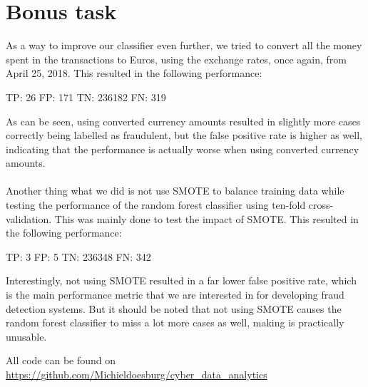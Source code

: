 \documentclass[]{article}
\begin{document}
\section{Bonus task}
As a way to improve our classifier even further, we tried to convert all the money spent in the transactions to Euros, using the exchange rates, once again, from April 25, 2018. This resulted in the following performance:
\begin{flushleft}
	TP: 26 \newline
	FP: 171  \newline
	TN: 236182 \newline
	FN: 319 \newline
\end{flushleft}
As can be seen, using converted currency amounts resulted in slightly more cases correctly being labelled as fraudulent, but the false positive rate is higher as well, indicating that the performance is actually worse when using converted currency amounts.\\
\\
Another thing what we did is not use SMOTE to balance training data while testing the performance of the random forest classifier using ten-fold cross-validation. This was mainly done to test the impact of SMOTE. This resulted in the following performance:
\begin{flushleft}
	TP: 3 \newline
	FP: 5  \newline
	TN: 236348 \newline
	FN: 342 \newline
\end{flushleft}
Interestingly, not using SMOTE resulted in a far lower false positive rate, which is the main performance metric that we are interested in for developing fraud detection systems. But it should be noted that not using SMOTE causes the random forest classifier to miss a lot more cases as well, making is practically unusable. 


All code can be found on \url{https://github.com/Michieldoesburg/cyber_data_analytics}
\end{document}
